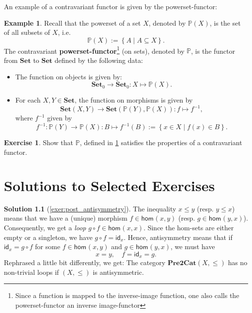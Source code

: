 \documentclass[a4paper,11pt, oneside,titlepage=false]{scrbook}
\theoremstyle{plain}
\theoremstyle{definition}
\newtheorem{exa}[thm]{Example}
\newtheorem{exer}[thm]{Exercise}
\newtheorem{solution}[thm]{Solution}
\newcommand{\cfont}[1]{\ensuremath{\mathsf{#1}}}
\newcommand{\Catb}[1]{\mathbf{#1}}
\newcommand{\SET}{\Catb{Set}}
\newcommand{\PREtoCAT}{\Catb{Pre2Cat}}
\newcommand{\Ob}[1]{{#1}_0}
\newcommand{\Hom}[3][]{\cfont{hom}_{#1}(#2,#3)}
\newcommand{\CHom}[3]{{#1}(#2,#3)}
\newcommand{\Id}[1][]{\cfont{id}_{#1}}
\newcommand{\co}[2]{\ensuremath{#2 \circ #1}}
\begin{document}
An example of a contravariant functor is given by the powerset-functor:
\begin{exa} \label{example:powersetfunctor} Recall that the powerset of a set $X$, denoted by $\mathbb{P}(X)$, is the set of all subsets of $X$, i.e.
\[
\mathbb{P}(X) :=  \left\{A \mid A\subseteq X\right\}.
\]
The contravariant \textbf{powerset-functor}\footnote{Since a function is mapped to the inverse-image function, one also calls the powerset-functor an inverse image-functor} (on sets), denoted by $\mathbb{P}$, is the functor from $\SET$ to $\SET$ defined by the following data:
\begin{itemize}
\item The function on objects is given by:
\[
\Ob{\SET}\to \Ob{\SET}: X\mapsto \mathbb{P}(X).
\]
\item For each $X,Y\in\SET$, the function on morphisms is given by
\[
\CHom{\SET}{X}{Y} \to \CHom{\SET}{\mathbb{P}(Y)}{\mathbb{P}(X)}: f\mapsto f^{-1},
\]
where $f^{-1}$ given by
\[
f^{-1}:\mathbb{P}(Y)\to \mathbb{P}(X): B\mapsto f^{-1}(B) := \left\{x\in X \mid f(x)\in B\right\}.
\]
\end{itemize}
\end{exa}

\begin{exer} Show that $\mathbb{P}$, defined in \cref{example:powersetfunctor} satisfies the properties of a contravariant functor.
\end{exer}




\chapter{Solutions to Selected Exercises}
\label{sec:solutions}

\begin{solution}[\cref{exer:post_antisymmetry}]\label{sol:post_antisymmetry}
The inequality $x\leq y$ (resp. $y\leq x$) means that we have a (unique) morphism $f\in \Hom{x}{y}$ (resp. $g\in \Hom{y}{x}$). Consequently, we get a \textit{loop} $\co{f}{g} \in \Hom{x}{x}$. Since the hom-sets are either empty or a singleton, we have $\co{f}{g} = \Id[x]$. Hence, antisymmetry means that if $\Id[x] = \co{f}{g}$ for some $f\in \Hom{x}{y}$ and $g\in \Hom{y}{x}$, we must have
\[x=y,\quad f = \Id[x] = g.\]
Rephrased a little bit differently, we get: The category $\PREtoCAT(X,\leq)$ has no non-trivial loops if $(X,\leq)$ is antisymmetric.
\end{solution}
\end{document}
